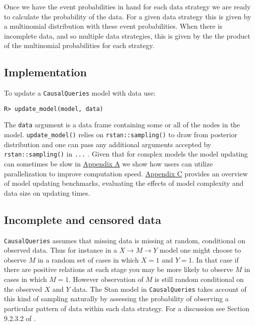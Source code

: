 \documentclass[
  11pt,
  article]{jss}
\begin{document}
Once we have the event probabilities in hand for each data strategy we
are ready to calculate the probability of the data. For a given data
strategy this is given by a multinomial distribution with these event
probabilities. When there is incomplete data, and so multiple data
strategies, this is given by the the product of the multinomial
probabilities for each strategy.

\hypertarget{implementation}{%
\subsection{Implementation}\label{implementation}}

To update a \texttt{CausalQueries} model with data use:

\begin{verbatim}
R> update_model(model, data)
\end{verbatim}

The \texttt{data} argument is a data frame containing some or all of the
nodes in the model. \texttt{update\_model()} relies on
\texttt{rstan::sampling()} to draw from posterior distribution and one
can pass any additional arguments accepted by \texttt{rstan::sampling()}
in \texttt{...} . Given that for complex models the model updating can
sometimes be slow in \protect\hyperlink{sec-parallel}{Appendix A} we
show how users can utilize parallelization to improve computation speed.
\protect\hyperlink{sec-benchmark}{Appendix C} provides an overview of
model updating benchmarks, evaluating the effects of model complexity
and data size on updating times.

\hypertarget{incomplete-and-censored-data}{%
\subsection{Incomplete and censored
data}\label{incomplete-and-censored-data}}

\texttt{CausalQueries} assumes that missing data is missing at random,
conditional on observed data. Thus for instance in a
\(X \rightarrow M \rightarrow Y\) model one might choose to observe
\(M\) in a random set of cases in which \(X=1\) and \(Y=1\). In that
case if there are positive relations at each stage you may be more
likely to observe \(M\) in cases in which \(M=1\). However observation
of \(M\) is still random conditional on the observed \(X\) and \(Y\)
data. The Stan model in \texttt{CausalQueries} takes account of this
kind of sampling naturally by assessing the probability of observing a
particular pattern of data within each data strategy. For a discussion
see Section 9.2.3.2 of \citet{humphreys_integrated_2023}.
\end{document}
